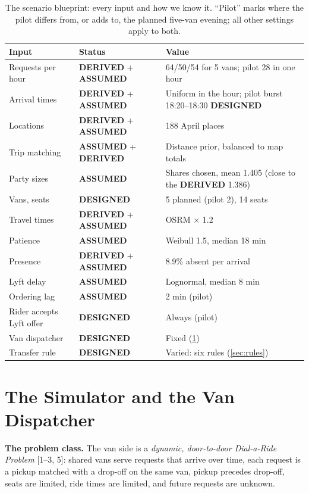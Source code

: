 \documentclass{article}
\newcommand{\lab}[1]{{\footnotesize\textsf{\textbf{#1}}}}
\newcommand{\DER}{\lab{DERIVED}}
\newcommand{\ASM}{\lab{ASSUMED}}
\newcommand{\DES}{\lab{DESIGNED}}
\begin{document}
\begin{table}[!ht]
\centering\small
\caption{The scenario blueprint: every input and how we know it. ``Pilot'' marks where the pilot differs from, or adds to, the planned five-van evening; all other settings apply to both.}\label{tab:blueprint}
\begin{tabularx}{\columnwidth}{@{}P{2.0cm}P{2.0cm}L@{}}
\toprule
\textbf{Input} & \textbf{Status} & \textbf{Value}\\
\midrule
Requests per hour & \DER{} + \ASM & 64/50/54 for 5 vans; pilot 28 in one hour\\
Arrival times & \DER{} + \ASM & Uniform in the hour; pilot burst 18:20--18:30 \DES\\
Locations & \DER{} + \ASM & 188 April places\\
Trip matching & \ASM{} + \DER & Distance prior, balanced to map totals\\
Party sizes & \ASM & Shares chosen, mean 1.405 (close to the \DER{} 1.386)\\
Vans, seats & \DES & 5 planned (pilot 2), 14 seats\\
Travel times & \DER{} + \ASM & OSRM $\times$ 1.2\\
Patience & \ASM & Weibull 1.5, median 18 min\\
Presence & \DER{} + \ASM & 8.9\% absent per arrival\\
Lyft delay & \ASM & Lognormal, median 8 min\\
Ordering lag & \ASM & 2 min (pilot)\\
Rider accepts Lyft offer & \DES & Always (pilot)\\
Van dispatcher & \DES & Fixed (\cref{sec:sim})\\
Transfer rule & \DES & Varied: six rules (\cref{sec:rules})\\
\bottomrule
\end{tabularx}
\end{table}

\section{The Simulator and the Van Dispatcher}\label{sec:sim}

\textbf{The problem class.} The van side is a \emph{dynamic, door-to-door Dial-a-Ride Problem} [1--3, 5]: shared vans serve requests that arrive over time, each request is a pickup matched with a drop-off on the same van, pickup precedes drop-off, seats are limited, ride times are limited, and future requests are unknown.
\end{document}
